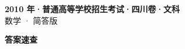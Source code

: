 \documentclass[zihao=-4, a4paper]{ctexart}
\begin{document}
\begin{center}
  {\Large\bfseries 2010 年·普通高等学校招生考试·四川卷·文科}\\[4pt]
  {\large 数学 · 简答版}
\end{center}
\medskip
{}

\clearpage
{}
\begin{center}{\Large\bfseries 答案速查}\end{center}
\medskip

\end{document}
